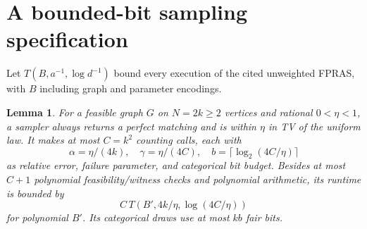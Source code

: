\documentclass[11pt]{article}
\newtheorem{lemma}[theorem]{Lemma}
\begin{document}
\section{A bounded-bit sampling specification}
Let $T(B,a^{-1},\log d^{-1})$ bound every execution of the cited unweighted FPRAS, with $B$ including graph and parameter encodings.
\begin{lemma}\label{lem:sampling}
For a feasible graph $G$ on $N=2k\ge2$ vertices and rational $0<\eta<1$, a sampler always returns a perfect matching and is within $\eta$ in TV of the uniform law. It makes at most $C=k^2$ counting calls, each with
\[
 \alpha=\eta/(4k),\quad\gamma=\eta/(4C),\quad
 b=\lceil\log_2(4C/\eta)\rceil
\]
as relative error, failure parameter, and categorical bit budget. Besides at most $C+1$ polynomial feasibility/witness checks and polynomial arithmetic, its runtime is bounded by
\[
 C\,T(B',4k/\eta,\log(4C/\eta))
\]
for polynomial $B'$. Its categorical draws use at most $kb$ fair bits.
\end{lemma}
\end{document}
